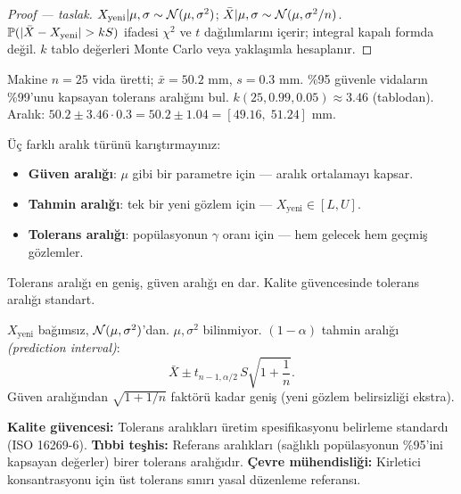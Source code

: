 \begin{proof}[Proof --- taslak]
$X_{\text{yeni}}|\mu,\sigma\sim\mathcal{N}(\mu,\sigma^2)$; $\bar X|\mu,\sigma\sim\mathcal{N}(\mu,\sigma^2/n)$. $\Prob(|\bar X-X_{\text{yeni}}|>kS)$ ifadesi $\chi^2$ ve $t$ dağılımlarını içerir; integral kapalı formda değil. $k$ tablo değerleri Monte Carlo veya yaklaşımla hesaplanır.
\end{proof}

\begin{ornek}
Makine $n=25$ vida üretti; $\bar{x}=50.2$ mm, $s=0.3$ mm. \%95 güvenle vidaların \%99'unu kapsayan tolerans aralığını bul. $k(25,0.99,0.05)\approx3.46$ (tablodan). Aralık: $50.2\pm3.46\cdot0.3=50.2\pm1.04=[49.16,\;51.24]$ mm.
\end{ornek}

\begin{hataanalizi}
Üç farklı aralık türünü karıştırmayınız:
\begin{itemize}
  \item \textbf{Güven aralığı}: $\mu$ gibi bir parametre için --- aralık ortalamayı kapsar.
  \item \textbf{Tahmin aralığı}: tek bir yeni gözlem için --- $X_{\text{yeni}}\in[L,U]$.
  \item \textbf{Tolerans aralığı}: popülasyonun $\gamma$ oranı için --- hem gelecek hem geçmiş gözlemler.
\end{itemize}
Tolerans aralığı en geniş, güven aralığı en dar. Kalite güvencesinde tolerans aralığı standart.
\end{hataanalizi}

\begin{teorem}\label{thm:tahmin_aralik}
$X_{\text{yeni}}$ bağımsız, $\mathcal{N}(\mu,\sigma^2)$'dan. $\mu,\sigma^2$ bilinmiyor. $(1-\alpha)$ tahmin aralığı \emph{(prediction interval)}:
\[
  \bar X \pm t_{n-1,\alpha/2}\,S\sqrt{1+\frac{1}{n}}.
\]
Güven aralığından $\sqrt{1+1/n}$ faktörü kadar geniş (yeni gözlem belirsizliği ekstra).
\end{teorem}

\begin{disiplinlerarasibaglan}
\textbf{Kalite güvencesi:} Tolerans aralıkları üretim spesifikasyonu belirleme standardı (ISO 16269-6). \textbf{Tıbbi teşhis:} Referans aralıkları (sağlıklı popülasyonun \%95'ini kapsayan değerler) birer tolerans aralığıdır. \textbf{Çevre mühendisliği:} Kirletici konsantrasyonu için üst tolerans sınırı yasal düzenleme referansı.
\end{disiplinlerarasibaglan}

